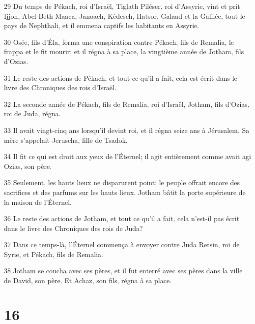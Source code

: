 \par 29 Du temps de Pékach, roi d'Israël, Tiglath Piléser, roi d'Assyrie, vint et prit Ijjon, Abel Beth Maaca, Janoach, Kédesch, Hatsor, Galaad et la Galilée, tout le pays de Nephthali, et il emmena captifs les habitants en Assyrie.
\par 30 Osée, fils d'Éla, forma une conspiration contre Pékach, fils de Remalia, le frappa et le fit mourir; et il régna à sa place, la vingtième année de Jotham, fils d'Ozias.
\par 31 Le reste des actions de Pékach, et tout ce qu'il a fait, cela est écrit dans le livre des Chroniques des rois d'Israël.
\par 32 La seconde année de Pékach, fils de Remalia, roi d'Israël, Jotham, fils d'Ozias, roi de Juda, régna.
\par 33 Il avait vingt-cinq ans lorsqu'il devint roi, et il régna seize ans à Jérusalem. Sa mère s'appelait Jeruscha, fille de Tsadok.
\par 34 Il fit ce qui est droit aux yeux de l'Éternel; il agit entièrement comme avait agi Ozias, son père.
\par 35 Seulement, les hauts lieux ne disparurent point; le peuple offrait encore des sacrifices et des parfums sur les hauts lieux. Jotham bâtit la porte supérieure de la maison de l'Éternel.
\par 36 Le reste des actions de Jotham, et tout ce qu'il a fait, cela n'est-il pas écrit dans le livre des Chroniques des rois de Juda?
\par 37 Dans ce temps-là, l'Éternel commença à envoyer contre Juda Retsin, roi de Syrie, et Pékach, fils de Remalia.
\par 38 Jotham se coucha avec ses pères, et il fut enterré avec ses pères dans la ville de David, son père. Et Achaz, son fils, régna à sa place.

\chapter{16}

